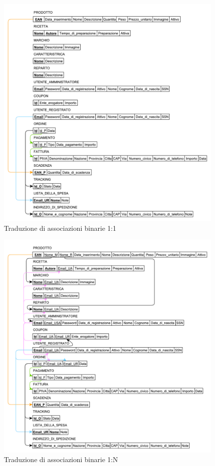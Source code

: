 	\begin{figure}[h]
		\centering
		\includegraphics[width=1\textwidth]
		{immagini/traduzione-associazioni-1-1}
		
		\caption{Traduzione di associazioni binarie 1:1}
	\end{figure}
	
	\begin{figure}[h]
		\centering
		\includegraphics[width=1\textwidth]
		{immagini/traduzione-associazioni-1-N}
		
		\caption{Traduzione di associazioni binarie 1:N}
	\end{figure}
	
